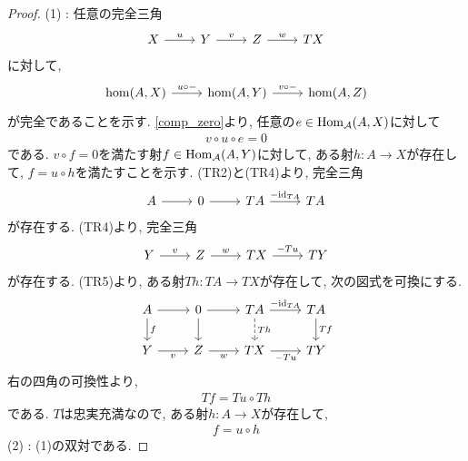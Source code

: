 \documentclass[uplatex, a4paper, 14Q, dvipdfmx]{jsarticle}
\begin{document}
\begin{proof}
  (1) : 任意の完全三角
  \[\begin{tikzcd}
    X & Y & Z & TX
    \arrow["u", from=1-1, to=1-2]
    \arrow["v", from=1-2, to=1-3]
    \arrow["w", from=1-3, to=1-4]
  \end{tikzcd}\]
  に対して, 
  \[\begin{tikzcd}
    {\hom(A,X)} & {\hom(A,Y)} & {\hom(A,Z)}
    \arrow["{u \circ -}", from=1-1, to=1-2]
    \arrow["{v \circ -}", from=1-2, to=1-3]
  \end{tikzcd}\]
  が完全であることを示す. 
  \cref{comp_zero}より, 任意の$e \in \mathrm{Hom}_{\mathcal{A}}(A,X)$に対して
  \begin{align*}
    v \circ u \circ e
    = 0
  \end{align*}
  である. 
  $v \circ f = 0$を満たす射$f \in \mathrm{Hom}_{\mathcal{A}}(A,Y)$に対して, ある射$h: A \to X$が存在して, $f = u \circ h$を満たすことを示す. 
  (TR2)と(TR4)より, 完全三角
  \[\begin{tikzcd}
    A & 0 & TA & TA
    \arrow[from=1-1, to=1-2]
    \arrow[from=1-2, to=1-3]
    \arrow["{-\id_{TA}}", from=1-3, to=1-4]
  \end{tikzcd}\]
  が存在する.
  (TR4)より, 完全三角
  \[\begin{tikzcd}
    Y & Z & TX & TY
    \arrow["v", from=1-1, to=1-2]
    \arrow["w", from=1-2, to=1-3]
    \arrow["{-Tu}", from=1-3, to=1-4]
  \end{tikzcd}\]
  が存在する. 
  (TR5)より, ある射$Th: TA \to TX$が存在して, 次の図式を可換にする. 
  \[\begin{tikzcd}
    A & 0 & TA & TA \\
    {Y} & {Z} & {TX} & {TY}
    \arrow[from=1-1, to=1-2]
    \arrow[from=1-2, to=1-3]
    \arrow["{-\id_{TA}}", from=1-3, to=1-4]
    \arrow["f", from=1-1, to=2-1]
    \arrow[from=1-2, to=2-2]
    \arrow["{Th}", dashed, from=1-3, to=2-3]
    \arrow["{Tf}", from=1-4, to=2-4]
    \arrow["{v}"', from=2-1, to=2-2]
    \arrow["{w}"', from=2-2, to=2-3]
    \arrow["{-Tu}"', from=2-3, to=2-4]
  \end{tikzcd}\]
  右の四角の可換性より, 
  \begin{align*}
    Tf 
    = Tu \circ Th
  \end{align*}
  である. 
  $T$は忠実充満なので, ある射$h: A \to X$が存在して, 
  \begin{align*}
    f 
    = u \circ h
  \end{align*}
  (2) : (1)の双対である. 
\end{proof}
\end{document}
